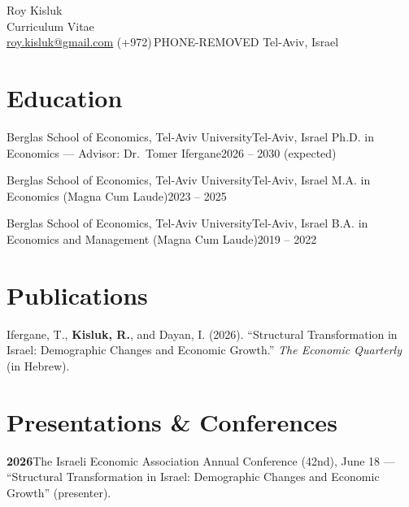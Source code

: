 \documentclass[a4paper, 10pt]{article}
\begin{document}
\begin{center}
  {\Calluna\fontsize{26pt}{26pt}\selectfont Roy Kisluk}\\[4pt]
  {\large Curriculum Vitae}\\[6pt]
  \href{mailto:roy.kisluk@gmail.com}{roy.kisluk@gmail.com} \;\textbullet\;
  (+972)\,PHONE-REMOVED \;\textbullet\; Tel-Aviv, Israel
\end{center}
\vspace{4pt}

\section{Education}
\cventry
{Berglas School of Economics, Tel-Aviv University}{Tel-Aviv, Israel}
{Ph.D. in Economics --- Advisor: Dr.\ Tomer Ifergane}{2026 -- 2030 (expected)}

\cventry
{Berglas School of Economics, Tel-Aviv University}{Tel-Aviv, Israel}
{M.A. in Economics (Magna Cum Laude)}{2023 -- 2025}

\cventry
{Berglas School of Economics, Tel-Aviv University}{Tel-Aviv, Israel}
{B.A. in Economics and Management (Magna Cum Laude)}{2019 -- 2022}

\section{Publications}
\cvEnum
\item Ifergane, T., \textbf{Kisluk, R.}, and Dayan, I. (2026). ``Structural Transformation in
Israel: Demographic Changes and Economic Growth.'' \textit{The Economic Quarterly} (in Hebrew).
\cvEnumEnd

\section{Presentations \& Conferences}
\cvPlain
\item \textbf{2026}\quad The Israeli Economic Association Annual Conference (42nd), June 18 ---
``Structural Transformation in Israel: Demographic Changes and Economic Growth'' (presenter).
\cvPlainEnd
\end{document}
